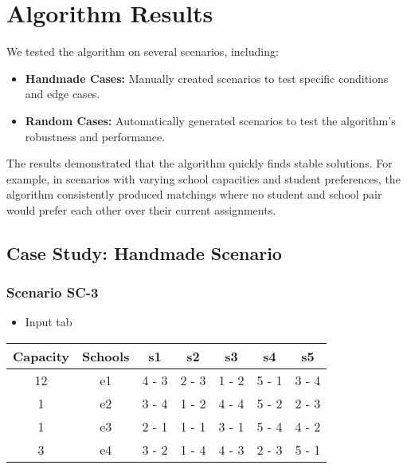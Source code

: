 \documentclass{article}
\begin{document}
\newpage{}
\section{Algorithm Results}
We tested the algorithm on several scenarios, including:

\begin{itemize}
    \item \textbf{Handmade Cases:} Manually created scenarios to test specific conditions and edge cases.

    \item \textbf{Random Cases:} Automatically generated scenarios to test the algorithm's robustness and performance.
\end{itemize}

The results demonstrated that the algorithm quickly finds stable solutions. For example, in scenarios with varying school capacities and student preferences, the algorithm consistently produced matchings where no student and school pair would prefer each other over their current assignments.

\subsection{Case Study: Handmade Scenario}

\subsubsection{Scenario SC-3}

\begin{itemize}
    \item Input tab
\end{itemize}

\begin{tabular}{|c|c|c|c|c|c|c|}
    \hline
    \textbf{Capacity} & \textbf{Schools} & \textbf{s1} & \textbf{s2} & \textbf{s3} & \textbf{s4} & \textbf{s5} \\
    \hline
    12                & e1               & 4 - 3       & 2 - 3       & 1 - 2       & 5 - 1       & 3 - 4       \\
    \hline
    1                 & e2               & 3 - 4       & 1 - 2       & 4 - 4       & 5 - 2       & 2 - 3       \\
    \hline
    1                 & e3               & 2 - 1       & 1 - 1       & 3 - 1       & 5 - 4       & 4 - 2       \\
    \hline
    3                 & e4               & 3 - 2       & 1 - 4       & 4 - 3       & 2 - 3       & 5 - 1       \\
    \hline
\end{tabular}
\end{document}
